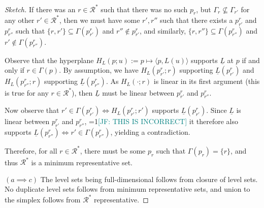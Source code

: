 \documentclass[12pt]{article}
\newcommand{\Comments}{1}
\newcommand{\mynote}[2]{\ifnum\Comments=1\textcolor{#1}{#2}\fi}
\newcommand{\jessie}[1]{\mynote{teal}{[JF: #1]}}
\newcommand{\R}{\mathcal{R}}
\newcommand{\risk}[1]{\underline{#1}}
\newcommand{\inprod}[2]{\langle #1, #2 \rangle}%
\begin{document}
\begin{proof}[Sketch]
  If there was an $r \in \R^*$ such that there was no such $p_r$, but $\Gamma_r \not \subseteq \Gamma_{r'}$ for any other $r' \in \R^*$, then we must have some $r', r''$ such that there exists a $p_{r'}^r$ and $p_{r''}^r$ such that $\{r,r'\} \subseteq \Gamma(p_{r'}^r)$ and $r'' \not \in p_{r'}^r$, and similarly, $\{r, r''\} \subseteq \Gamma(p_{r''}^r)$ and $r' \not \in \Gamma(p_{r''}^r)$.
  
  Observe that the hyperplane $H_L(p; u) := p \mapsto \inprod{p}{L(u)}$ supports $\risk{L}$ at $p$ if and only if $r \in \Gamma(p)$.
  By assumption, we have $H_L(p_{r'}^r; r)$ supporting $\risk{L}(p_{r'}^r)$ and $H_L(p_{r''}^r; r)$ supporting $\risk{L}(p_{r''}^r)$.
  As $H_L(\cdot;r)$ is linear in its first argument (this is true for any $r \in \R^*$), then $\risk{L}$ must be linear between $p_{r'}^r$ and $p_{r''}^r$.
  
  Now observe that 
  $r' \in \Gamma(p_{r'}^r) \iff H_L(p_{r'}^r; r')$ supports $\risk{L}(p_{r'}^r)$.
  Since $\risk{L}$ is linear between $p_{r'}^r$ and $p_{r''}^r$, \jessie{THIS IS INCORRECT} it therefore also supports $\risk{L}(p_{r''}^r) \iff r' \in \Gamma(p_{r''}^r)$, yielding a contradiction.
  
  Therefore, for all $r \in \R^*$, there must be some $p_r$ such that $\Gamma(p_r) = \{r\}$, and thus $\R^*$ is a minimum representative set.
  

  
  $(a \implies c)$
  The level sets being full-dimensional follows from closure of level sets.
  No duplicate level sets follows from minimum representative sets, and union to the simplex follows from $\R^*$ representative.
\end{proof}
\end{document}
